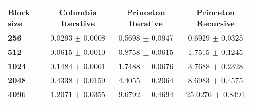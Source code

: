 \begin{tabular}{lccc}\toprule
\textbf{Block size}  & \textbf{Columbia Iterative} & \textbf{Princeton Iterative} & \textbf{Princeton Recursive}\\\midrule
\textbf{256}  & 0.0293 $\pm$ 0.0008 & 0.5698 $\pm$ 0.0947 & 0.6929 $\pm$ 0.0325\\
\textbf{512}  & 0.0615 $\pm$ 0.0010 & 0.8758 $\pm$ 0.0615 & 1.7515 $\pm$ 0.1245\\
\textbf{1024}  & 0.1484 $\pm$ 0.0061 & 1.7488 $\pm$ 0.0676 & 3.7688 $\pm$ 0.2328\\
\textbf{2048}  & 0.4338 $\pm$ 0.0159 & 4.4055 $\pm$ 0.2064 & 8.6983 $\pm$ 0.4575\\
\textbf{4096} & 1.2071 $\pm$ 0.0355 & 9.6792 $\pm$ 0.4694 & 25.0276 $\pm$ 0.8491\\
\bottomrule
\end{tabular}
